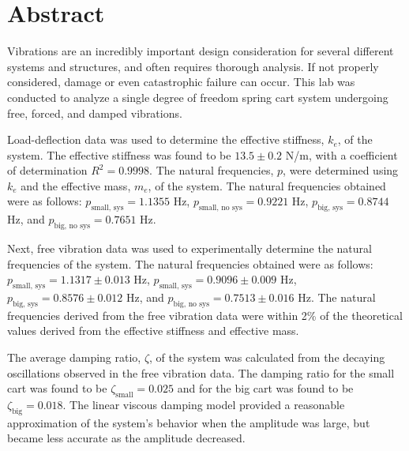 \section{Abstract}
Vibrations are an incredibly important design consideration for several different systems and structures, and often requires thorough analysis. If not properly considered, damage or even catastrophic failure can occur. This lab was conducted to analyze a single degree of freedom spring cart system undergoing free, forced, and damped vibrations.


Load-deflection data was used to determine the effective stiffness, $k_e$, of the system. The effective stiffness was found to be $13.5 \pm 0.2$ N/m, with a coefficient of determination $R^2 = 0.9998$. The natural frequencies, $p$, were determined using $k_e$ and the effective mass, $m_e$, of the system. The natural frequencies obtained were as follows: $p_{\text{small, sys}} = 1.1355$ Hz, $p_{\text{small, no sys}} = 0.9221$ Hz, $p_{\text{big, sys}} = 0.8744$ Hz, and $p_{\text{big, no sys}} = 0.7651$ Hz. 

Next, free vibration data was used to experimentally determine the natural frequencies of the system. The natural frequencies obtained were as follows: $p_{\text{small, sys}} = 1.1317 \pm 0.013$ Hz, $p_{\text{small, sys}} = 0.9096 \pm 0.009$ Hz, $p_{\text{big, sys}} = 0.8576 \pm 0.012$ Hz, and $p_{\text{big, no sys}} = 0.7513 \pm 0.016$ Hz. The natural frequencies derived from the free vibration data were within 2\% of the theoretical values derived from the effective stiffness and effective mass.

The average damping ratio, $\zeta$, of the system was calculated from the decaying oscillations observed in the free vibration data. The damping ratio for the small cart was found to be $\zeta_{\text{small}} = 0.025$ and for the big cart was found to be $\zeta_{\text{big}} = 0.018$. The linear viscous damping model provided a reasonable approximation of the system's behavior when the amplitude was large, but became less accurate as the amplitude decreased.

